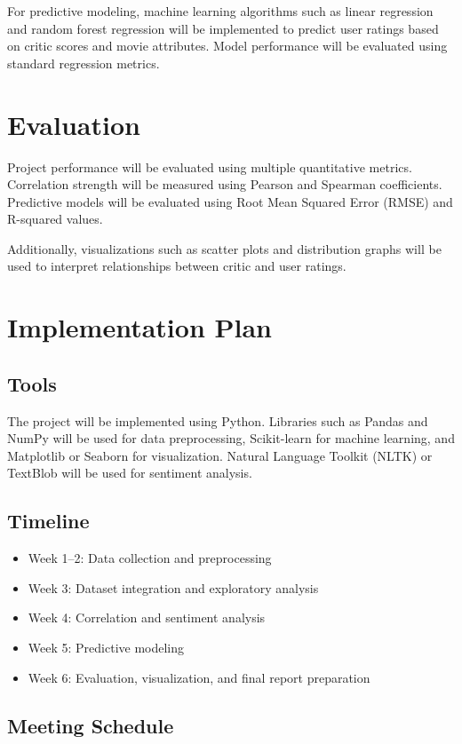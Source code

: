 \documentclass[conference]{IEEEtran}
\begin{document}
For predictive modeling, machine learning algorithms such as linear
regression and random forest regression will be implemented to predict
user ratings based on critic scores and movie attributes. Model
performance will be evaluated using standard regression metrics.



\section{Evaluation}

Project performance will be evaluated using multiple quantitative
metrics. Correlation strength will be measured using Pearson and
Spearman coefficients. Predictive models will be evaluated using
Root Mean Squared Error (RMSE) and R-squared values.

Additionally, visualizations such as scatter plots and distribution
graphs will be used to interpret relationships between critic and
user ratings.

\section{Implementation Plan}

\subsection{Tools}
The project will be implemented using Python. Libraries such as
Pandas and NumPy will be used for data preprocessing, Scikit-learn
for machine learning, and Matplotlib or Seaborn for visualization.
Natural Language Toolkit (NLTK) or TextBlob will be used for
sentiment analysis.

\subsection{Timeline}
\begin{itemize}
  \item Week 1--2: Data collection and preprocessing
  \item Week 3: Dataset integration and exploratory analysis
  \item Week 4: Correlation and sentiment analysis
  \item Week 5: Predictive modeling
  \item Week 6: Evaluation, visualization, and final report preparation
\end{itemize}

\subsection{Meeting Schedule}
\end{document}

